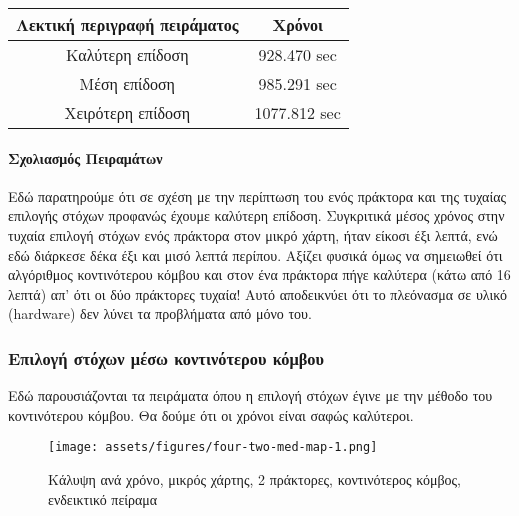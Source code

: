 

\begingroup
\centering
\begin{tabular}{c | c }
	\textbf{Λεκτική περιγραφή πειράματος} & \textbf{Χρόνοι}\\ \hline{}
	Καλύτερη επίδοση & 928.470 sec \\ \hline
	Μέση επίδοση & 985.291 sec   \\ \hline
	Χειρότερη επίδοση & 1077.812 sec \\
\end{tabular}
\endgroup
\paragraph{Σχολιασμός Πειραμάτων}

Εδώ παρατηρούμε ότι σε σχέση με την περίπτωση του ενός πράκτορα και της τυχαίας επιλογής στόχων προφανώς έχουμε καλύτερη επίδοση. Συγκριτικά μέσος χρόνος στην τυχαία επιλογή στόχων ενός πράκτορα στον μικρό χάρτη, ήταν είκοσι έξι λεπτά, ενώ εδώ διάρκεσε δέκα έξι και μισό λεπτά περίπου. Αξίζει φυσικά όμως να σημειωθεί ότι αλγόριθμος κοντινότερου κόμβου και στον ένα πράκτορα πήγε καλύτερα (κάτω από 16 λεπτά) απ' ότι οι δύο πράκτορες τυχαία! Αυτό αποδεικνύει ότι το πλεόνασμα σε υλικό (hardware) δεν λύνει τα προβλήματα από μόνο του. 

\newpage



\subsubsection{Επιλογή στόχων μέσω κοντινότερου κόμβου}

Εδώ παρουσιάζονται τα πειράματα όπου η επιλογή στόχων έγινε με την μέθοδο του κοντινότερου κόμβου. Θα δούμε ότι οι χρόνοι είναι σαφώς καλύτεροι. 


\begin{figure}[!h]	
	\texttt{[image: assets/figures/four-two-med-map-1.png]}
	\caption{Κάλυψη ανά χρόνο, μικρός χάρτης, 2 πράκτορες, κοντινότερος κόμβος, ενδεικτικό πείραμα }
\end{figure}


